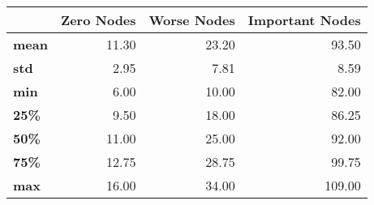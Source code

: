 \begin{tabular}{lrrr}
\toprule
{} &  Zero Nodes &  Worse Nodes &  Important Nodes \\
\midrule
\textbf{mean} &       11.30 &        23.20 &            93.50 \\
\textbf{std } &        2.95 &         7.81 &             8.59 \\
\textbf{min } &        6.00 &        10.00 &            82.00 \\
\textbf{25\% } &        9.50 &        18.00 &            86.25 \\
\textbf{50\% } &       11.00 &        25.00 &            92.00 \\
\textbf{75\% } &       12.75 &        28.75 &            99.75 \\
\textbf{max } &       16.00 &        34.00 &           109.00 \\
\bottomrule
\end{tabular}
